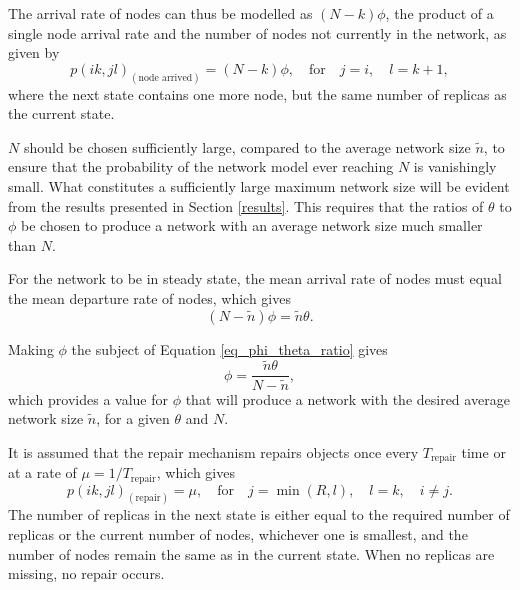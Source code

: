 The arrival rate of nodes can thus be modelled as $(N - k)\phi$, the product of a single node arrival rate and the number of nodes not currently in the network, as given by
%
\begin{equation} \label{eq_node_arrived}
    p(i k,j l)_{(\textrm{node arrived})} = (N - k)\phi,\quad\textrm{for}\quad j = i,\quad l = k + 1,
\end{equation}
%
where the next state contains one more node, but the same number of replicas as the current state.


$N$ should be chosen sufficiently large, compared to the average network size $\tilde{n}$, to ensure that the probability of the network model ever reaching $N$ is vanishingly small. What constitutes a sufficiently large maximum network size will be evident from the results presented in Section \ref{results}. This requires that the ratios of $\theta$ to $\phi$ be chosen to produce a network with an average network size much smaller than $N$.

For the network to be in steady state, the mean arrival rate of nodes must equal the mean departure rate of nodes, which gives
%
\begin{equation}
    (N - \tilde{n})\phi = \tilde{n}\theta.\label{eq_phi_theta_ratio}
\end{equation}

Making $\phi$ the subject of Equation \eqref{eq_phi_theta_ratio} gives
%
\begin{equation}
    \phi = \frac{\tilde{n}\theta}{N - \tilde{n}},\label{eq_phi}
\end{equation}
%
which provides a value for $\phi$ that will produce a network with the desired average network size $\tilde{n}$, for a given $\theta$ and $N$.

It is assumed that the repair mechanism repairs objects once every $T_{\textrm{repair}}$ time or at a rate of $\mu = 1/T_{\textrm{repair}}$, which gives
%
\begin{equation} \label{eq_repair}
    p(i k,j l)_{(\textrm{repair})} = \mu,\quad\textrm{for}\quad j = \min(R, l),\quad l = k,\quad i \neq j.
\end{equation}
%
The number of replicas in the next state is either equal to the required number of replicas or the current number of nodes, whichever one is smallest, and the number of nodes remain the same as in the current state. When no replicas are missing, no repair occurs.

